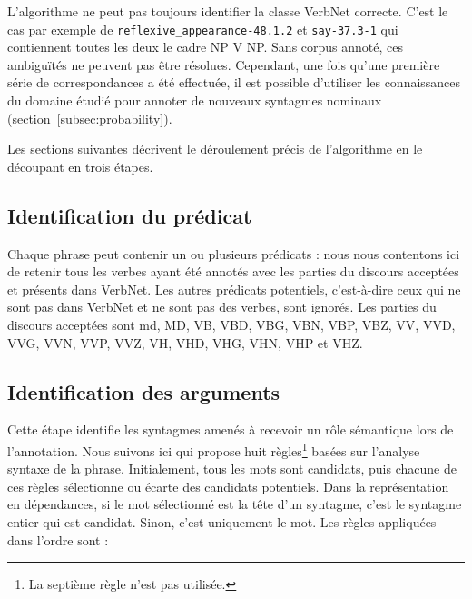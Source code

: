 L'algorithme ne peut pas toujours identifier la classe VerbNet correcte. C'est
le cas par exemple de \texttt{reflexive\_appearance-48.1.2} et
\texttt{say-37.3-1} qui contiennent toutes les deux le cadre NP V NP. Sans
corpus annoté, ces ambiguïtés ne peuvent pas être résolues.  Cependant, une
fois qu'une première série de correspondances a été effectuée, il est possible
d'utiliser les connaissances du domaine étudié pour annoter de nouveaux
syntagmes nominaux (section~\ref{subsec:probability}).

Les sections suivantes décrivent le déroulement précis de l'algorithme en le
découpant en trois étapes.

\subsection{Identification du prédicat}

Chaque phrase peut contenir un ou plusieurs prédicats : nous nous contentons
ici de retenir tous les verbes ayant été annotés avec les parties du discours
acceptées et présents dans VerbNet. Les autres prédicats potentiels,
c'est-à-dire ceux qui ne sont pas dans VerbNet et ne sont pas des verbes, sont
ignorés. Les parties du discours acceptées sont md, MD, VB, VBD, VBG, VBN, VBP,
VBZ, VV, VVD, VVG, VVN, VVP, VVZ, VH, VHD, VHG, VHN, VHP et VHZ.


\subsection{Identification des arguments}

Cette étape identifie les syntagmes amenés à recevoir un rôle sémantique lors
de l'annotation. Nous suivons ici \cite{lang2011unsupervised} qui propose huit
règles\footnote{La septième règle n'est pas utilisée.} basées sur l'analyse
syntaxe de la phrase. Initialement, tous les mots sont candidats, puis chacune
de ces règles sélectionne ou écarte des candidats potentiels. Dans la
représentation en dépendances, si le mot sélectionné est la tête d'un syntagme,
c'est le syntagme entier qui est candidat. Sinon, c'est uniquement le mot. Les
règles appliquées dans l'ordre sont :


